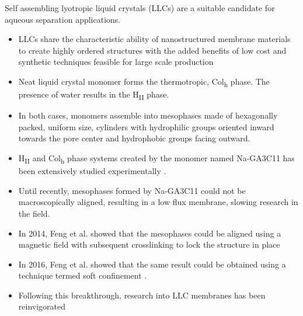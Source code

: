 \documentclass{article}
\begin{document}
  Self assembling lyotropic liquid crystals (LLCs) are a suitable candidate for
  aqueous separation applications. 
  \begin{itemize}
    \item LLCs share the characteristic ability of nanostructured membrane
    materials to create highly ordered structures with the added benefits
    of low cost and synthetic techniques feasible for 
    large scale production \cite{feng_scalable_2014}
    \item Neat liquid crystal monomer forms the thermotropic, Col\textsubscript{h}
    phase. The presence of water results in the H\textsubscript{II} phase.
    \item In both cases, monomers assemble into mesophases made of hexagonally
    packed, uniform size, cylinders with hydrophilic groups oriented inward
    towards the pore center and hydrophobic groups facing outward.
    \item H\textsubscript{II} and Col\textsubscript{h} phase systems created by
    the monomer named Na-GA3C11 has been extensively studied experimentally \cite{smith_ordered_1997, %
    zhou_supported_2005,resel_h2-phase_2000,feng_scalable_2014,feng_thin_2016}. 
    \item Until recently, mesophases formed by Na-GA3C11 could not be macroscopically
    aligned, resulting in a low flux membrane, slowing research in the field.
    \item In 2014, Feng et al. showed that the mesophases could be aligned 
    using a magnetic field with subsequent crosslinking to lock the structure
    in place \cite{feng_scalable_2014}
    \item In 2016, Feng et al. showed that the same result could be obtained 
    using a technique termed soft confinement \cite{feng_thin_2016}.
    \item Following this breakthrough, research into LLC membranes has been
    reinvigorated
  \end{itemize}
 
\end{document}
